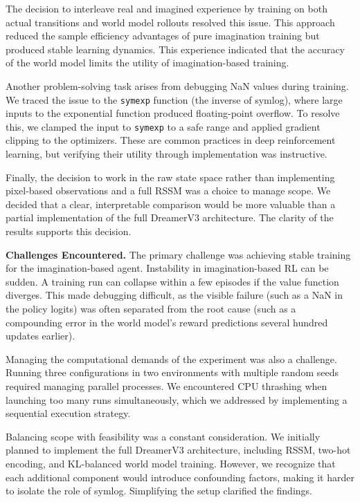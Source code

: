 The decision to interleave real and imagined experience by training on both actual transitions and world model rollouts resolved this issue. This approach reduced the sample efficiency advantages of pure imagination training but produced stable learning dynamics. This experience indicated that the accuracy of the world model limits the utility of imagination-based training.

Another problem-solving task arises from debugging NaN values during training. We traced the issue to the \texttt{symexp} function (the inverse of symlog), where large inputs to the exponential function produced floating-point overflow. To resolve this, we clamped the input to \texttt{symexp} to a safe range and applied gradient clipping to the optimizers. These are common practices in deep reinforcement learning, but verifying their utility through implementation was instructive.

Finally, the decision to work in the raw state space rather than implementing pixel-based observations and a full RSSM was a choice to manage scope. We decided that a clear, interpretable comparison would be more valuable than a partial implementation of the full DreamerV3 architecture. The clarity of the results supports this decision.

\bigskip

\noindent\textbf{Challenges Encountered.}
The primary challenge was achieving stable training for the imagination-based agent. Instability in imagination-based RL can be sudden. A training run can collapse within a few episodes if the value function diverges. This made debugging difficult, as the visible failure (such as a NaN in the policy logits) was often separated from the root cause (such as a compounding error in the world model's reward predictions several hundred updates earlier).

Managing the computational demands of the experiment was also a challenge. Running three configurations in two environments with multiple random seeds required managing parallel processes. We encountered CPU thrashing when launching too many runs simultaneously, which we addressed by implementing a sequential execution strategy.

Balancing scope with feasibility was a constant consideration. We initially planned to implement the full DreamerV3 architecture, including RSSM, two-hot encoding, and KL-balanced world model training. However, we recognize that each additional component would introduce confounding factors, making it harder to isolate the role of symlog. Simplifying the setup clarified the findings.

